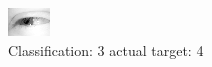 \begin{figure}[h!]
\begin{center}
\includegraphics[width=0.60\columnwidth]{figures/ID2451_class_3_target_4.png}
\end{center}
\caption{ Classification: 3 actual target: 4}
\label{fig:ID2451_class_3_target_4}
\end{figure}
